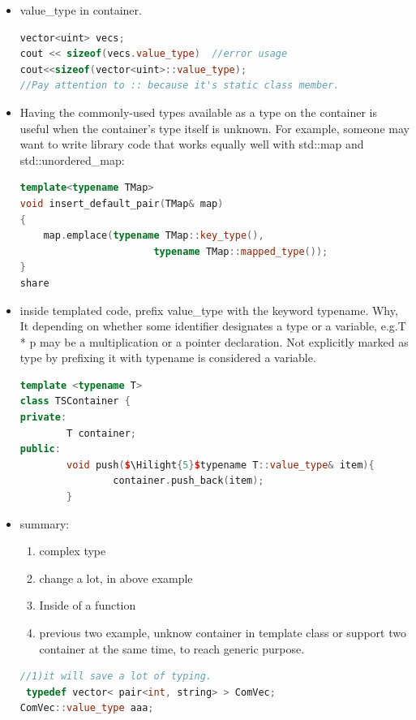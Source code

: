 \documentclass[a4paper,12pt,twoside]{book}
\newcommand{\Hilight}[1]{\makebox[0pt][l]{\color{yellow}\rule[-3pt]{#1em}{11pt}}}
\begin{document}
\begin{itemize}
\item value\_type in container.
\begin{lstlisting}[frame=single, language=c++]
vector<uint> vecs;
cout << sizeof(vecs.value_type)  //error usage
cout<<sizeof(vector<uint>::value_type);
//Pay attention to :: because it's static class member.
\end{lstlisting}

\item Having the commonly-used types available as a type on the container is useful when the container's type itself is unknown. For example, someone may want to write library code that works equally well with std::map and std::unordered\_map:
\begin{lstlisting}[frame=single, language=c++]
template<typename TMap>
void insert_default_pair(TMap& map)
{
    map.emplace(typename TMap::key_type(),
                       typename TMap::mapped_type());
}
share
\end{lstlisting}

\item inside templated code, prefix value\_type with the keyword typename. Why, It depending on whether some identifier designates a type or a variable, e.g.T * p may be a multiplication or a pointer declaration. Not explicitly marked as type by prefixing it with typename is considered a variable.

\begin{lstlisting}[frame=single, language=c++, mathescape=true]
template <typename T>
class TSContainer {
private:
        T container;
public:
        void push($\Hilight{5}$typename T::value_type& item){
                container.push_back(item);
        }
\end{lstlisting}


\item summary:
\begin{enumerate}
\item complex type
\item change a lot, in above example
\item Inside of a function
\item previous two example, unknow container in template class or support two container at the same time, to reach generic purpose.
\end{enumerate}
\begin{lstlisting}[frame=single, language=c++, mathescape=true]
//1)it will save a lot of typing.
 typedef vector< pair<int, string> > ComVec;
ComVec::value_type aaa;


\end{lstlisting}
\end{itemize}
\end{document}
